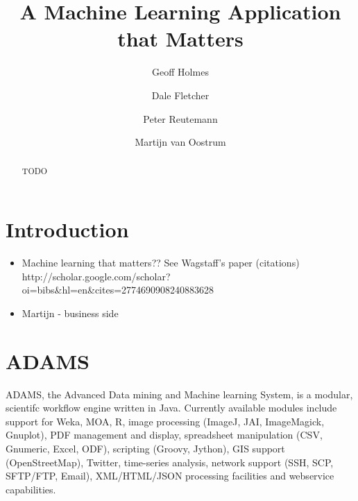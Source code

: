 \documentclass{llncs}
\begin{document}
%
%
\mainmatter              %
%
\title{A Machine Learning Application that Matters}
%
%
\author{Geoff Holmes \and Dale Fletcher \and Peter Reutemann \and Martijn van Oostrum}
%
%
%

\maketitle              %

\begin{abstract}
TODO
\end{abstract}

\section{Introduction}
\begin{itemize}
  \item Machine learning that matters?? See Wagstaff’s paper (citations) \\
    http://scholar.google.com/scholar?oi=bibs\&hl=en\&cites=2774690908240883628
  \item Martijn - business side
\end{itemize}

\section{ADAMS}
ADAMS, the Advanced Data mining and Machine learning System, is a modular,
scientifc workflow engine written in Java. Currently available modules
include support for Weka, MOA, R, image processing (ImageJ, JAI, ImageMagick,
Gnuplot), PDF management and display, spreadsheet manipulation (CSV,
Gnumeric, Excel, ODF), scripting (Groovy, Jython), GIS support
(OpenStreetMap), Twitter, time-series analysis, network support (SSH,
SCP, SFTP/FTP, Email), XML/HTML/JSON processing facilities and
webservice capabilities.
\end{document}
